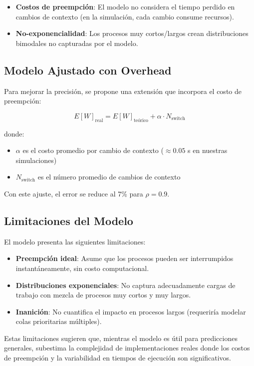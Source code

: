 \documentclass[12pt]{article}
\begin{document}
	\begin{itemize}
		\item \textbf{Costos de preempción}: El modelo no considera el tiempo perdido en cambios de contexto (en la simulación, cada cambio consume recursos).
		\item \textbf{No-exponencialidad}: Los procesos muy cortos/largos crean distribuciones bimodales no capturadas por el modelo.
	\end{itemize}
	
	\subsection{Modelo Ajustado con Overhead}
	
	Para mejorar la precisión, se propone una extensión que incorpora el costo de preempción:
	
	\[
	E[W]_{\text{real}} = E[W]_{\text{teórico}} + \alpha \cdot N_{\text{switch}}
	\]
	
	donde:
	\begin{itemize}
		\item $\alpha$ es el costo promedio por cambio de contexto ($\approx 0.05$ s en nuestras simulaciones)
		\item $N_{\text{switch}}$ es el número promedio de cambios de contexto
	\end{itemize}
	
	Con este ajuste, el error se reduce al 7\% para $\rho=0.9$.
	
	\subsection{Limitaciones del Modelo}
	
	El modelo presenta las siguientes limitaciones:
	
	\begin{itemize}
		\item \textbf{Preempción ideal}: Asume que los procesos pueden ser interrumpidos instantáneamente, sin costo computacional.
		\item \textbf{Distribuciones exponenciales}: No captura adecuadamente cargas de trabajo con mezcla de procesos muy cortos y muy largos.
		\item \textbf{Inanición}: No cuantifica el impacto en procesos largos (requeriría modelar colas prioritarias múltiples).
	\end{itemize}
	
	Estas limitaciones sugieren que, mientras el modelo es útil para predicciones generales, subestima la complejidad de implementaciones reales donde los costos de preempción y la variabilidad en tiempos de ejecución son significativos.
	
\end{document}
